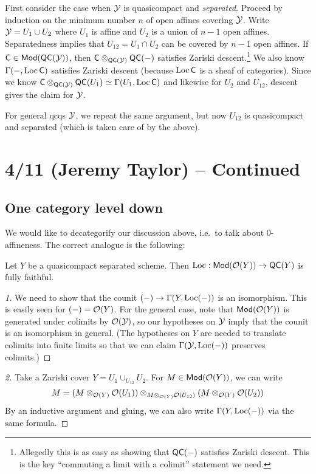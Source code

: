 \documentclass{article}
\begin{document}
First consider the case when $\mathcal{Y}$ is quasicompact and \emph{separated}.
Proceed by induction on the minimum number $n$ of open affines covering $\mathcal{Y}$.
Write $\mathcal{Y} = U_1 \cup U_2$ where $U_1$ is affine and $U_2$ is a union of $n-1$ open affines.
Separatedness implies that $U_{12} = U_1 \cap U_2$ can be covered by $n-1$ open affines.
If $\mathsf{C} \in \mathsf{Mod}(\mathsf{QC}(\mathcal{Y}))$, then $\mathsf{C} \otimes_{\mathsf{QC}(\mathcal{Y})} \mathsf{QC}(-)$ satisfies Zariski descent.\footnote{Allegedly this is as easy as showing that $\mathsf{QC}(-)$ satisfies Zariski descent.
This is the key ``commuting a limit with a colimit'' statement we need.}
We also know $\Gamma(-, \operatorname{Loc} \mathsf{C})$ satisfies Zariski descent (because $\operatorname{Loc} \mathsf{C}$ is a sheaf of categories).
Since we know $\mathsf{C} \otimes_{\mathsf{QC}(\mathcal{Y})} \mathsf{QC}(U_1) \simeq \Gamma(U_1, \operatorname{Loc} \mathsf{C})$ and likewise for $U_2$ and $U_{12}$, descent gives the claim for $\mathcal{Y}$.

For general qcqs $\mathcal{Y}$, we repeat the same argument, but now $U_{12}$ is quasicompact and separated (which is taken care of by the above).

\section{4/11 (Jeremy Taylor) -- Continued}

\subsection{One category level down}

We would like to decategorify our discussion above, i.e.\ to talk about $0$-affineness.
The correct analogue is the following:

\begin{prop}
	Let $Y$ be a quasicompact separated scheme.
	Then $\operatorname{Loc}: \mathsf{Mod}(\mathcal{O}(Y)) \to \mathsf{QC}(Y)$ is fully faithful.
\end{prop}

\begin{proof}[1]
	We need to show that the counit $(-) \to \Gamma(Y, \operatorname{Loc}(-))$ is an isomorphism.
	This is easily seen for $(-) = \mathcal{O}(Y)$.
	For the general case, note that $\mathsf{Mod}(\mathcal{O}(Y))$ is generated under colimits by $\mathcal{O}(\mathcal{Y})$, so our hypotheses on $\mathcal{Y}$ imply that the counit is an isomorphism in general.
	(The hypotheses on $Y$ are needed to translate colimits into finite limits so that we can claim $\Gamma(\mathcal{Y}, \operatorname{Loc}(-))$ preserves colimits.)
\end{proof}

\begin{proof}[2]
	Take a Zariski cover $Y = U_1 \cup_{U_{12}} U_2$.
	For $M \in \mathsf{Mod}(\mathcal{O}(Y))$, we can write 
	\[
		M = (M \otimes_{\mathcal{O}(Y)} \mathcal{O}(U_1)) \otimes_{M \otimes_{\mathcal{O}(Y)} \mathcal{O}(U_{12})} (M \otimes_{\mathcal{O}(Y)} \mathcal{O}(U_2))
	\]
	By an inductive argument and gluing, we can also write $\Gamma(Y, \operatorname{Loc}(-))$ via the same formula.
\end{proof}
\end{document}
